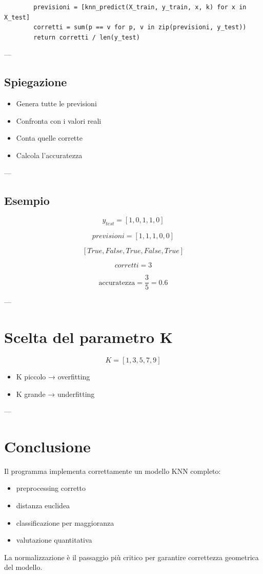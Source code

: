 \documentclass[a4paper,12pt]{article}
\begin{document}
	\begin{lstlisting}
		previsioni = [knn_predict(X_train, y_train, x, k) for x in X_test]
		corretti = sum(p == v for p, v in zip(previsioni, y_test))
		return corretti / len(y_test)
	\end{lstlisting}
	
	---
	
	\subsection{Spiegazione}
	
	\begin{itemize}
		\item Genera tutte le previsioni
		\item Confronta con i valori reali
		\item Conta quelle corrette
		\item Calcola l’accuratezza
	\end{itemize}
	
	---
	
	\subsection{Esempio}
	
	\[
	y_{test} = [1,0,1,1,0]
	\]
	
	\[
	previsioni = [1,1,1,0,0]
	\]
	
	\[
	[True, False, True, False, True]
	\]
	
	\[
	corretti = 3
	\]
	
	\[
	\text{accuratezza} = \frac{3}{5} = 0.6
	\]
	
	---
	
	\section{Scelta del parametro K}
	
	\[
	K = [1,3,5,7,9]
	\]
	
	\begin{itemize}
		\item K piccolo → overfitting
		\item K grande → underfitting
	\end{itemize}
	
	---
	
	\section{Conclusione}
	
	Il programma implementa correttamente un modello KNN completo:
	
	\begin{itemize}
		\item preprocessing corretto
		\item distanza euclidea
		\item classificazione per maggioranza
		\item valutazione quantitativa
	\end{itemize}
	
	La normalizzazione è il passaggio più critico per garantire correttezza geometrica del modello.
	
\end{document}
